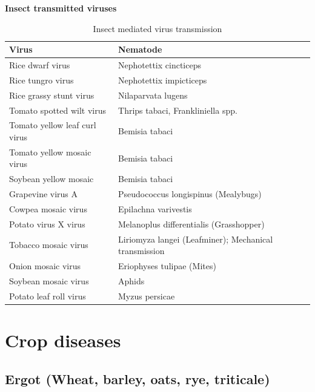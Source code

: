 \documentclass[
  openany]{book}
\begin{document}
\textbf{Insect transmitted viruses}

\begin{table}

\caption{\label{tab:insect-transmissed-viruses}Insect mediated virus transmission}
\centering
\begin{tabular}[t]{ll}
\toprule
Virus & Nematode\\
\midrule
\rowcolor{gray!6}  Rice dwarf virus & Nephotettix cincticeps\\
Rice tungro virus & Nephotettix impicticeps\\
\rowcolor{gray!6}  Rice grassy stunt virus & Nilaparvata lugens\\
Tomato spotted wilt virus & Thrips tabaci, Frankliniella spp.\\
\rowcolor{gray!6}  Tomato yellow leaf curl virus & Bemisia tabaci\\
\addlinespace
Tomato yellow mosaic virus & Bemisia tabaci\\
\rowcolor{gray!6}  Soybean yellow mosaic & Bemisia tabaci\\
Grapevine virus A & Pseudococcus longispinus (Mealybugs)\\
\rowcolor{gray!6}  Cowpea mosaic virus & Epilachna varivestis\\
Potato virus X virus & Melanoplus differentialis (Grasshopper)\\
\addlinespace
\rowcolor{gray!6}  Tobacco mosaic virus & Liriomyza langei (Leafminer); Mechanical transmission\\
Onion mosaic virus & Eriophyses tulipae (Mites)\\
\rowcolor{gray!6}  Soybean mosaic virus & Aphids\\
Potato leaf roll virus & Myzus persicae\\
\bottomrule
\end{tabular}
\end{table}

\hypertarget{crop-diseases}{%
\section{Crop diseases}\label{crop-diseases}}

\hypertarget{ergot-wheat-barley-oats-rye-triticale}{%
\subsection{Ergot (Wheat, barley, oats, rye, triticale)}\label{ergot-wheat-barley-oats-rye-triticale}}
\end{document}
